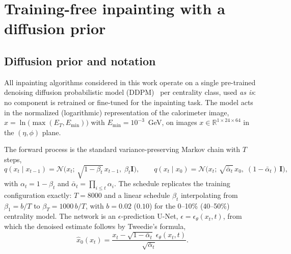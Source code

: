 
\section{Training-free inpainting with a diffusion prior}
\label{sec:inpainting}

\subsection{Diffusion prior and notation}
\label{sec:inpainting:notation}

All inpainting algorithms considered in this work operate on a single
pre-trained denoising diffusion probabilistic model
(DDPM)~\cite{ho2020ddpm} per centrality class, used \emph{as is}: no
component is retrained or fine-tuned for the inpainting task.  The model
acts in the normalized (logarithmic) representation of the calorimeter
image, $x = \ln\!\bigl(\max(E_T, E_{\min})\bigr)$ with
$E_{\min} = 10^{-3}$~GeV, on images $x \in \mathbb{R}^{1\times 24\times 64}$
in the $(\eta,\phi)$ plane.

The forward process is the standard variance-preserving Markov chain with
$T$ steps,
\begin{equation}
  q(x_t \mid x_{t-1}) = \mathcal{N}\!\bigl(x_t;\,
      \sqrt{1-\beta_t}\, x_{t-1},\; \beta_t \mathbf{I}\bigr),
  \qquad
  q(x_t \mid x_0) = \mathcal{N}\!\bigl(x_t;\,
      \sqrt{\bar\alpha_t}\, x_0,\; (1-\bar\alpha_t)\,\mathbf{I}\bigr),
  \label{eq:forward}
\end{equation}
with $\alpha_t = 1-\beta_t$ and $\bar\alpha_t = \prod_{i\le t}\alpha_i$.
The schedule replicates the training configuration exactly: $T = 8000$ and
a linear schedule $\beta_t$ interpolating from $\beta_1 = b/T$ to
$\beta_T = 1000\,b/T$, with $b = 0.02$ ($0.10$) for the 0--10\%
(40--50\%) centrality model.  The network is an
$\epsilon$-prediction U-Net, $\hat\epsilon = \epsilon_\theta(x_t, t)$, from
which the denoised estimate follows by Tweedie's formula,
\begin{equation}
  \hat{x}_0(x_t)
  = \frac{x_t - \sqrt{1-\bar\alpha_t}\;\epsilon_\theta(x_t, t)}
         {\sqrt{\bar\alpha_t}} .
  \label{eq:tweedie}
\end{equation}

